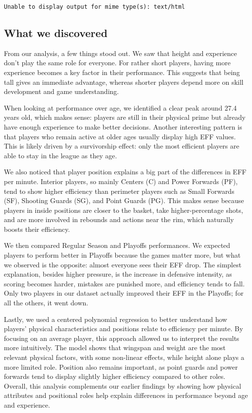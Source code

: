 \documentclass[
  letterpaper,
  DIV=11,
  numbers=noendperiod]{scrartcl}
\begin{document}
\begin{verbatim}
Unable to display output for mime type(s): text/html
\end{verbatim}

\subsection{What we discovered}\label{what-we-discovered}

From our analysis, a few things stood out. We saw that height and
experience don't play the same role for everyone. For rather short
players, having more experience becomes a key factor in their
performance. This suggests that being tall gives an immediate advantage,
whereas shorter players depend more on skill development and game
understanding.

When looking at performance over age, we identified a clear peak around
27.4 years old, which makes sense: players are still in their physical
prime but already have enough experience to make better decisions.
Another interesting pattern is that players who remain active at older
ages usually display high EFF values. This is likely driven by a
survivorship effect: only the most efficient players are able to stay in
the league as they age.

We also noticed that player position explains a big part of the
differences in EFF per minute. Interior players, so mainly Centers (C)
and Power Forwards (PF), tend to show higher efficiency than perimeter
players such as Small Forwards (SF), Shooting Guards (SG), and Point
Guards (PG). This makes sense because players in inside positions are
closer to the basket, take higher-percentage shots, and are more
involved in rebounds and actions near the rim, which naturally boosts
their efficiency.

We then compared Regular Season and Playoffs performances. We expected
players to perform better in Playoffs because the games matter more, but
what we observed is the opposite: almost everyone sees their EFF drop.
The simplest explanation, besides higher pressure, is the increase in
defensive intensity, as scoring becomes harder, mistakes are punished
more, and efficiency tends to fall. Only two players in our dataset
actually improved their EFF in the Playoffs; for all the others, it went
down.

Lastly, we used a centered polynomial regression to better understand
how players' physical characteristics and positions relate to efficiency
per minute. By focusing on an average player, this approach allowed us
to interpret the results more intuitively. The model shows that wingspan
and weight are the most relevant physical factors, with some non-linear
effects, while height alone plays a more limited role. Position also
remains important, as point guards and power forwards tend to display
slightly higher efficiency compared to other roles. Overall, this
analysis complements our earlier findings by showing how physical
attributes and positional roles help explain differences in performance
beyond age and experience.
\end{document}
